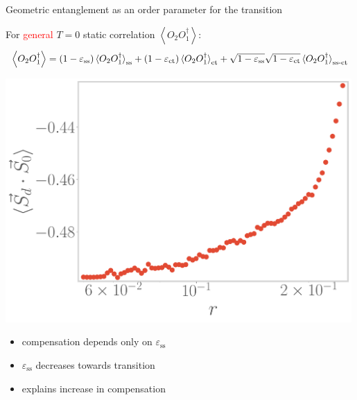 \documentclass[11pt,aspectratio=169]{beamer}
\newcommand{\focus}[1]{\textcolor{red}{#1}}
\begin{document}
\begin{frame}{Geometric entanglement as an order parameter for the transition}

	For \focus{general} \(T=0\) static correlation \(\left<O_2 O_1^\dagger \right>\):
	\[\left<O_2 O_1^\dagger\right> = \left(1 - \varepsilon_\text{ss}\right) \braket{O_2 O_1^\dagger}_\text{ss} + \left(1 - \varepsilon_\text{ct}\right) \braket{O_2 O_1^\dagger}_\text{ct} + \sqrt{1 - \varepsilon_\text{ss}}\sqrt{1 - \varepsilon_\text{ct}}\braket{O_2 O_1^\dagger}_\text{ss-ct}\]

\begin{minipage}{0.5\textwidth}
\includegraphics[width=0.99\textwidth]{figures/compens.pdf}
\end{minipage}
\begin{minipage}{0.49\textwidth}
	\begin{itemize}
		\item compensation depends only on \(\varepsilon_\text{ss}\)\\[20pt]
		\item \(\varepsilon_\text{ss}\) decreases towards transition\\[20pt]
		\item explains increase in compensation
	\end{itemize}
\end{minipage}

\vspace*{\fill}

\end{frame}
\end{document}
